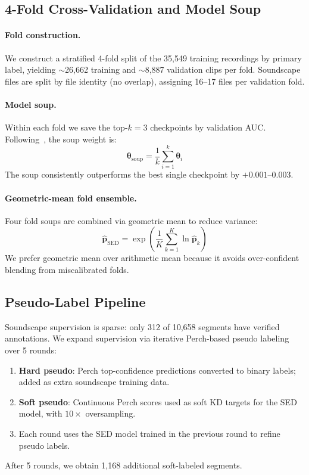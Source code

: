\documentclass[10pt,twocolumn]{article}
\newcommand{\vtheta}{\bm{\theta}}
\begin{document}
\subsection{4-Fold Cross-Validation and Model Soup}
\label{sec:cv}

\paragraph{Fold construction.}
We construct a stratified 4-fold split of the 35,549 training recordings
by primary label, yielding $\sim$26,662 training and $\sim$8,887 validation
clips per fold.
Soundscape files are split by file identity (no overlap), assigning
16--17 files per validation fold.

\paragraph{Model soup.}
Within each fold we save the top-$k=3$ checkpoints by validation AUC.
Following~\cite{wortsman2022soup}, the soup weight is:
\begin{equation}
  \vtheta_\text{soup} = \frac{1}{k}\sum_{i=1}^{k} \vtheta_i
  \label{eq:soup}
\end{equation}
The soup consistently outperforms the best single checkpoint by $+0.001$--$0.003$.

\paragraph{Geometric-mean fold ensemble.}
Four fold soups are combined via geometric mean to reduce variance:
\begin{equation}
  \hat{\bm{p}}_\text{SED} = \exp\!\left(\frac{1}{K}\sum_{k=1}^{K}\ln\hat{\bm{p}}_k\right)
  \label{eq:geomean}
\end{equation}
We prefer geometric mean over arithmetic mean because it avoids
over-confident blending from miscalibrated folds.

\subsection{Pseudo-Label Pipeline}
\label{sec:pseudo}

Soundscape supervision is sparse: only 312 of 10,658 segments have
verified annotations.
We expand supervision via iterative Perch-based pseudo labeling over 5 rounds:
\begin{enumerate}[leftmargin=1.5em,noitemsep]
  \item \textbf{Hard pseudo}: Perch top-confidence predictions converted to
    binary labels; added as extra soundscape training data.
  \item \textbf{Soft pseudo}: Continuous Perch scores used as soft KD targets
    for the SED model, with $10\times$ oversampling.
  \item Each round uses the SED model trained in the previous round to
    refine pseudo labels.
\end{enumerate}
After 5 rounds, we obtain 1,168 additional soft-labeled segments.
\end{document}
